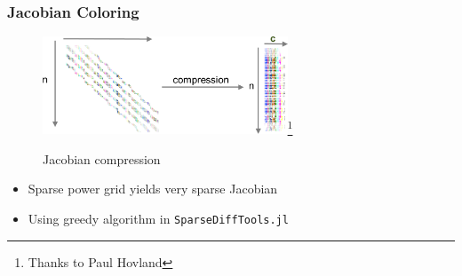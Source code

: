 \begin{frame}
  \frametitle{Jacobian Coloring}
  \begin{center}
    \begin{figure}
      \includegraphics[width=0.65\textwidth]{figures/compression}\footnote{Thanks to Paul Hovland}
      \caption{Jacobian compression}
    \end{figure}
  \end{center}
  \begin{itemize}
    \item Sparse power grid yields very sparse Jacobian
    \item Using greedy algorithm in \lstinline{SparseDiffTools.jl}
  \end{itemize}
\end{frame}

